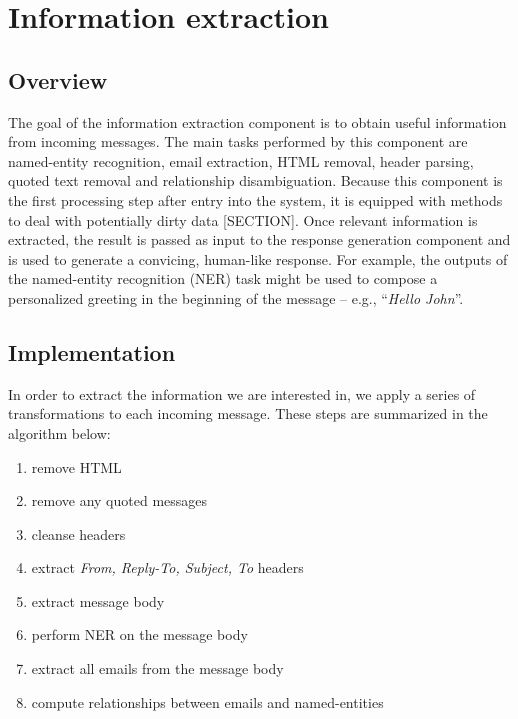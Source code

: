 \chapter{Information extraction}

\section{Overview}
The goal of the information extraction component is to obtain useful information from incoming messages. The main tasks performed by this component are named-entity recognition, email extraction, HTML removal, header parsing, quoted text removal and relationship disambiguation. Because this component is the first processing step after entry into the system, it is equipped with methods to deal with potentially dirty data [SECTION]. Once relevant information is extracted, the result is passed as input to the response generation component and is used to generate a convicing, human-like response. For example, the outputs of the named-entity recognition (NER) task might be used to compose a personalized greeting in the beginning of the message -- e.g., ``\textit{Hello John}''.

\section{Implementation}
In order to extract the information we are interested in, we apply a series of transformations to each incoming message. These steps are summarized in the algorithm below:
\begin{enumerate}
\item remove HTML %
\vspace{-5mm}
\item remove any quoted messages %
\vspace{-5mm}
\item cleanse headers %
\vspace{-5mm}
\item extract \textit{From, Reply-To, Subject, To} headers %
\vspace{-5mm}
\item extract message body %
\vspace{-5mm}
\item perform NER on the message body %
\vspace{-5mm}
\item extract all emails from the message body %
\vspace{-5mm}
\item compute relationships between emails and named-entities %
\end{enumerate}


